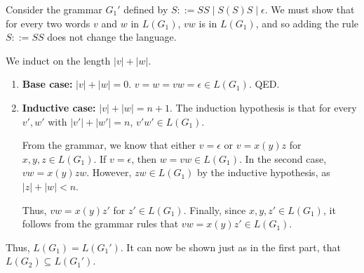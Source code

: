 \begin{exercise}{}
\begin{solution}
\begin{enumerate}
      Consider the grammar \(G_1'\) defined by \(S ::= SS \mid S(S)S \mid
      \epsilon\). We must show that for every two words \(v\) and \(w\) in
      \(L(G_1)\), \(vw\) is in \(L(G_1)\), and so adding the rule \(S ::= SS\)
      does not change the language.

      We induct on the length \(|v| + |w|\). 
      
      \begin{enumerate}
        \item \textbf{Base case:} \(|v| + |w| = 0\). \(v = w = vw = \epsilon \in
        L(G_1)\). QED.
        \item \textbf{Inductive case:} \(|v| + |w| = n + 1\). The induction
        hypothesis is that for every \(v', w'\) with \(|v'| + |w'| = n\), \(v'w'
        \in L(G_1)\).

        From the grammar, we know that either \(v = \epsilon\) or \(v = x(y)z\)
        for \(x, y, z \in L(G_1)\). If \(v = \epsilon\), then \(w = vw \in
        L(G_1)\). In the second case, \(vw = x(y)zw\). However, \(zw \in
        L(G_1)\) by the inductive hypothesis, as \(|z| + |w| < n \).

        Thus, \(vw = x(y)z'\) for \(z' \in L(G_1)\). Finally, since \(x, y, z'
        \in L(G_1)\), it follows from the grammar rules that \(vw = x(y)z' \in
        L(G_1)\). 
      \end{enumerate}
      
      Thus, \(L(G_1) = L(G_1')\). It can now be shown just as in the first part,
      that \(L(G_2) \subseteq L(G_1')\).
    \end{enumerate}
    
  \end{solution}
  
\end{exercise}

